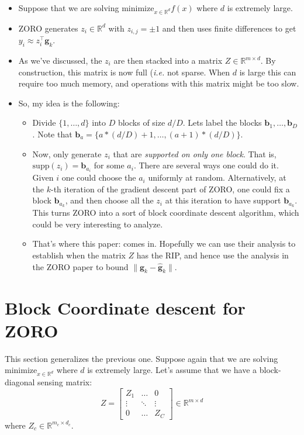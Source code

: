 \documentclass{article}
\begin{document}
\begin{itemize}
	\item Suppose that we are solving $\text{minimize}_{x\in\mathbb{R}^{d}} f(x)$ where $d$ is extremely large.
	\item ZORO generates $z_{i}\in\mathbb{R}^{d}$ with $z_{i,j} = \pm 1$ and then uses finite differences to get $y_{i} \approx z_{i}^{\top}\mathbf{g}_k$. 
	\item As we've discussed, the $z_i$ are then stacked into a matrix $Z\in\mathbb{R}^{m\times d}$. By construction, this matrix is now full ({\em i.e.} not sparse. When $d$ is large this can require too much memory, and operations with this matrix might be too slow.
	\item So, my idea is the following:
		\begin{itemize}
			\item Divide $\{1,\ldots, d\}$ into $D$ blocks of size $d/D$. Lets label the blocks $\mathbf{b}_{1},\ldots, \mathbf{b}_{D}$. Note that $\mathbf{b}_{a} = \{a*(d/D)+1,\ldots, (a+1)*(d/D)\}$. 
			\item Now, only generate $z_{i}$ that are {\em supported on only one block}. That is, $\text{supp}(z_i) = \mathbf{b}_{a_i}$ for some $a_i$. There are several ways one could do it. Given $i$ one could choose the $a_i$ uniformly at random. Alternatively, at the $k$-th iteration of the gradient descent part of ZORO, one could fix a block $\mathbf{b}_{a_{k}}$, and then choose all the $z_i$ at this iteration to have support $\mathbf{b}_{a_k}$. This turns ZORO into a sort of block coordinate descent algorithm, which could be very interesting to analyze.
			\item That's where this paper: \cite{chun2020uniform} comes in. Hopefully we can use their analysis to establish when the matrix $Z$ has the RIP, and hence use the analysis in the ZORO paper to bound $\|\mathbf{g}_k - \hat{\mathbf{g}}_k\|$. 
		
		\end{itemize}

\end{itemize}

\section{Block Coordinate descent for ZORO}
This section generalizes the previous one. Suppose again that we are solving $\text{minimize}_{x\in\mathbb{R}^{d}}$ where $d$ is extremely large. Let's assume that we have a block-diagonal sensing matrix:
$$
Z = \left[\begin{matrix} Z_1 & \ldots & 0 \\ \vdots & \ddots & \vdots \\ 0 & \ldots & Z_{C}\end{matrix} \right] \in \mathbb{R}^{m\times d}
$$
where $Z_{c}\in\mathbb{R}^{m_{c}\times d_{c}}$. 
\end{document}
